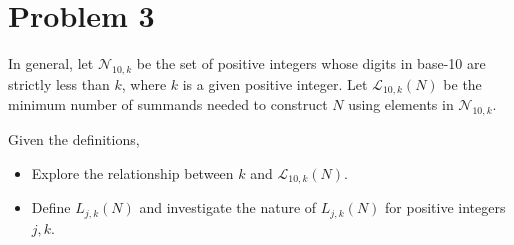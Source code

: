 \section{Problem 3}
In general, let  $\mathcal{N}_{10, k}$ be the set of positive integers whose digits in base-10 are strictly less than $k$, where $k$ is a given positive integer. Let $\mathcal{L}_{10,k}(N)$ be the minimum number of summands needed to construct $N$ using elements in $\mathcal{N}_{10,k}$.

\begin{problem}
  Given the definitions, 
  \begin{itemize}
    \item Explore the relationship between $k$ and $\mathcal{L}_{10, k}(N)$.
    \item Define $L_{j, k}(N)$ and investigate the nature of $L_{j, k}(N)$ for positive integers $j, k$.
  \end{itemize}
\end{problem}
